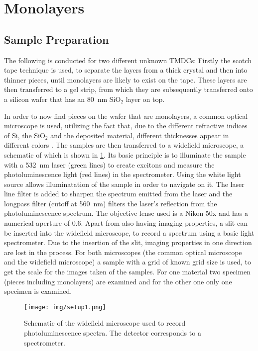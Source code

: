 \newpage
\section{Monolayers}
\label{sec:mono}

\subsection{Sample Preparation}

The following is conducted for two different unknown TMDCs:
Firstly the scotch tape technique is used, to separate the layers from a thick crystal and then into thinner pieces, until monolayers are likely to exist on the tape.
These layers are then transferred to a gel strip, from which they are subsequently transferred onto a silicon wafer that has an \SI{80}{nm} SiO$_2$ layer on top.

In order to now find pieces on the wafer that are monolayers, a common optical microscope is used, utilizing the fact that, due to the different refractive indices of Si, the SiO$_2$ and the deposited material, different thicknesses appear in different colors \cite{benameur2011}.
The samples are then transferred to a widefield microscope, a schematic of which is shown in \cref{fig_widefield}.
Its basic principle is to illuminate the sample with a \SI{532}{nm} laser (green lines) to create excitons and measure the photoluminescence light (red lines) in the spectrometer.
Using the white light source allows illuminatation of the sample in order to navigate on it.
The laser line filter is added to sharpen the spectrum emitted from the laser and the longpass filter (cutoff at \SI{560}{nm}) filters the laser's reflection from the photoluminescence spectrum.
The objective lense used is a Nikon 50x and has a numerical aperture of \SI{0.6}{}.
Apart from also having imaging properties, a slit can be inserted into the widefield microscope, to record a spectrum using a basic light spectrometer.
Due to the insertion of the slit, imaging properties in one direction are lost in the process.
For both microscopes (the common optical microscope and the widefield microscope) a sample with a grid of known grid size is used, to get the scale for the images taken of the samples.
For one material two specimen (pieces including monolayers) are examined and for the other one only one specimen is examined.

\begin{figure}[!ht]
    \centering
    \texttt{[image: img/setup1.png]}
    \caption{Schematic of the widefield microscope used to record photoluminescence spectra. The detector corresponds to a spectrometer.}
    \label{fig_widefield}
\end{figure}


